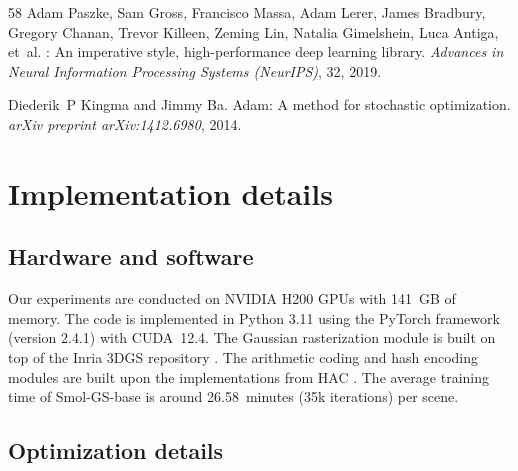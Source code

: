 \documentclass{article}
\newcommand{\ours}{Smol-GS\xspace}
\begin{document}
\begin{thebibliography}{58}
Adam Paszke, Sam Gross, Francisco Massa, Adam Lerer, James Bradbury, Gregory
  Chanan, Trevor Killeen, Zeming Lin, Natalia Gimelshein, Luca Antiga, et~al.
: An imperative style, high-performance deep learning
  library.
\newblock \emph{Advances in Neural Information Processing Systems (NeurIPS)},
  32, 2019.

Diederik~P Kingma and Jimmy Ba.
\newblock Adam: A method for stochastic optimization.
\newblock \emph{arXiv preprint arXiv:1412.6980}, 2014.

\end{thebibliography}




\clearpage
\setcounter{page}{1}
%
\appendix

%
\renewcommand{\thetable}{A\arabic{table}}
\renewcommand{\thefigure}{A\arabic{figure}}


\section{Implementation details}
\label{app:implementation_details}

%
%
\subsection{Hardware and software}
\label{app:hardware}
Our experiments are conducted on NVIDIA H200 GPUs with 141~GB of memory. %
The code is implemented in Python 3.11 using the PyTorch framework (version 2.4.1) \cite{paszke2019pytorch} with CUDA~12.4. The Gaussian rasterization module is built on top of the Inria 3DGS repository \cite{kerbl20233dgs}. The arithmetic coding and hash encoding modules are built upon the implementations from HAC \cite{chen2024hac}. The average training time of \ours-base is around 26.58~minutes (35k iterations) per scene.

\subsection{Optimization details}
\end{document}
